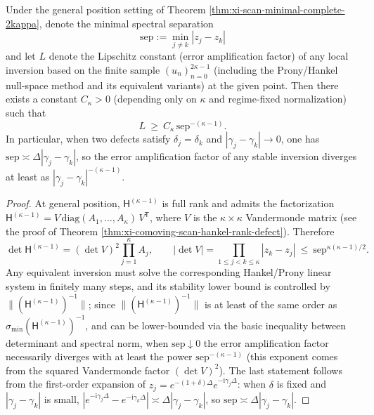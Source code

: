 \begin{corollary}\label{cor:xi-scan-collision-illposedness}
Under the general position setting of Theorem \ref{thm:xi-scan-minimal-complete-2kappa}, denote the minimal spectral separation
\[
\boxed{\;
\mathrm{sep}:=\min_{j\neq k}|z_j-z_k|\;}
\]
and let \(L\) denote the Lipschitz constant (error amplification factor) of any local inversion based on the finite sample \((u_n)_{n=0}^{2\kappa-1}\) (including the Prony/Hankel null-space method and its equivalent variants) at the given point.
Then there exists a constant \(C_\kappa>0\) (depending only on \(\kappa\) and regime-fixed normalization) such that
\[
\boxed{\;
L\ \ge\ C_\kappa\,\mathrm{sep}^{-(\kappa-1)}.\;}
\]
In particular, when two defects satisfy \(\delta_j=\delta_k\) and \(|\gamma_j-\gamma_k|\to 0\), one has \(\mathrm{sep}\asymp \Delta|\gamma_j-\gamma_k|\), so the error amplification factor of any stable inversion diverges at least as \(|\gamma_j-\gamma_k|^{-(\kappa-1)}\).
\end{corollary}

\begin{proof}
At general position, \(\mathsf H^{(\kappa-1)}\) is full rank and admits the factorization
\(
\mathsf H^{(\kappa-1)}=V\,\mathrm{diag}(A_1,\dots,A_\kappa)\,V^{\mathsf T}
\), where \(V\) is the \(\kappa\times\kappa\) Vandermonde matrix (see the proof of Theorem \ref{thm:xi-comoving-scan-hankel-rank-defect}).
Therefore
\[
\det\mathsf H^{(\kappa-1)}=(\det V)^2\prod_{j=1}^{\kappa}A_j,
\qquad
|\det V|=\prod_{1\le j<k\le \kappa}|z_k-z_j|
\ \le\ \mathrm{sep}^{\kappa(\kappa-1)/2}.
\]
Any equivalent inversion must solve the corresponding Hankel/Prony linear system in finitely many steps, and its stability lower bound is controlled by \(\|(\mathsf H^{(\kappa-1)})^{-1}\|\);
since \(\|(\mathsf H^{(\kappa-1)})^{-1}\|\) is at least of the same order as \(\sigma_{\min}(\mathsf H^{(\kappa-1)})^{-1}\), and can be lower-bounded via the basic inequality between determinant and spectral norm, when \(\mathrm{sep}\downarrow 0\) the error amplification factor necessarily diverges with at least the power \(\mathrm{sep}^{-(\kappa-1)}\) (this exponent comes from the squared Vandermonde factor \((\det V)^2\)).
The last statement follows from the first-order expansion of \(z_j=e^{-(1+\delta)\Delta}e^{-\mathrm{i}\gamma_j\Delta}\): when \(\delta\) is fixed and \(|\gamma_j-\gamma_k|\) is small, \(|e^{-\mathrm{i}\gamma_j\Delta}-e^{-\mathrm{i}\gamma_k\Delta}|\asymp \Delta|\gamma_j-\gamma_k|\), so \(\mathrm{sep}\asymp \Delta|\gamma_j-\gamma_k|\). \qedhere
\end{proof}

